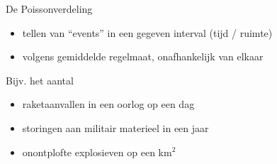 \documentclass{beamer}
\begin{document}
	\begin{frame}{De Poissonverdeling}
		
		\begin{itemize}
			\item tellen van ``events'' in een gegeven interval (tijd / ruimte)
			\item volgens gemiddelde regelmaat, onafhankelijk van elkaar
		\end{itemize}
	
		\vfill 
%								
%								
%								
	
		Bijv. het aantal
		\begin{itemize}
			\item raketaanvallen in een oorlog op een dag
			\item storingen aan militair materieel in een jaar
			\item onontplofte explosieven op een km$^2$
		\end{itemize}
%				
%				
%				
		
				
	\end{frame}
		
\end{document}
